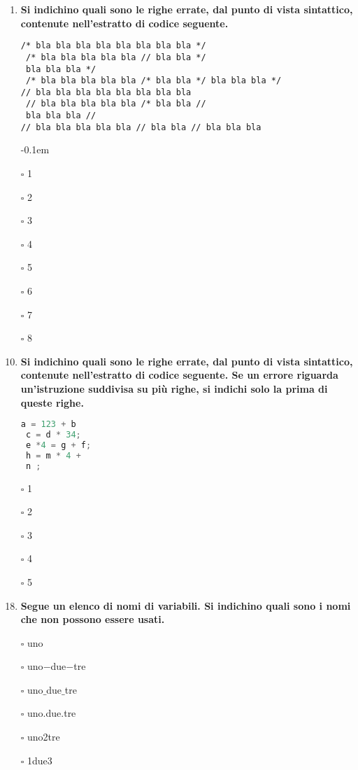 \documentclass[9pt]{article}
\begin{document}
\begin{enumerate}
\item {\bf Si indichino quali sono le righe errate, dal punto di vista sintattico, contenute nell'estratto di codice seguente. }
\begin{lstlisting}[]
/* bla bla bla bla bla bla bla bla */
 /* bla bla bla bla bla // bla bla */
 bla bla bla */
 /* bla bla bla bla bla /* bla bla */ bla bla bla */
// bla bla bla bla bla bla bla bla
 // bla bla bla bla bla /* bla bla //
 bla bla bla //
// bla bla bla bla bla // bla bla // bla bla bla
\end{lstlisting}
\itemsep-0.1em
\item[$\square$] 1
\item[$\square$] 2
\item[$\square$] 3
\item[$\square$] 4
\item[$\square$] 5
\item[$\square$] 6
\item[$\square$] 7
\item[$\square$] 8

\item {\bf Si indichino quali sono le righe errate, dal punto di vista sintattico, contenute nell'estratto di codice seguente. Se un errore riguarda un'istruzione
suddivisa su pi\`{u} righe, si indichi solo la prima di queste righe.}
 \begin{lstlisting}[language=c]
 a = 123 + b
 c = d * 34;
 e *4 = g + f;
 h = m * 4 +
 n ;
 \end{lstlisting}
\item [\nonumber]
\item [\nonumber]
\item[$\square$] 1
\item[$\square$] 2
\item[$\square$] 3
\item[$\square$] 4
\item[$\square$] 5

 \item {\bf Segue un elenco di nomi di variabili. Si indichino quali sono i nomi che non possono essere usati.}
\item[$\square$]  uno
\item[$\square$] uno$-$due$-$tre
\item[$\square$]  uno$\_$due$\_$tre
\item[$\square$]  uno.due.tre
\item[$\square$]  uno2tre
\item[$\square$] 1due3


\end{enumerate}
\end{document}
